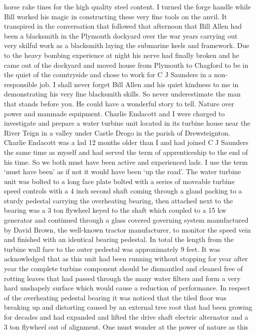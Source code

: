 horse rake tines for the high quality steel content. I turned the forge handle
while Bill worked his magic in constructing these very fine tools on the anvil.
It transpired in the conversation that followed that afternoon that Bill Allen
had been a blacksmith in the Plymouth dockyard over the war years carrying out
very skilful work as a blacksmith laying the submarine keels and framework. Due
to the heavy bombing experience at night his nerve had finally broken and he
came out of the dockyard and moved house from Plymouth to Chagford to be in the
quiet of the countryside and chose to work for C J Saunders in a
non-responsible job. I shall never forget Bill Allen and his quiet kindness to
me in demonstrating his very fine blacksmith skills. So never underestimate
the man that stands before you. He could have a wonderful story to tell.
Nature over power and manmade equipment. Charlie Endacott and I were charged
to investigate and prepare a water turbine unit located in its turbine house
near the River Teign in a valley under Castle Drogo in the parish of
Drewsteignton. Charlie Endacott was a lad 12 months older than I and had
joined C J Saunders the same time as myself and had served the term of
apprenticeship to the end of his time. So we both must have been active and
experienced lads. I use the term ‘must have been' as if not it would have
been ‘up the road'. The water turbine unit was bolted to a long face plate
bolted with a series of moveable turbine speed controls with a 4 inch second
shaft coming through a gland packing to a sturdy pedestal carrying the
overheating bearing, then attached next to the bearing was a 3 ton flywheel
keyed to the shaft which coupled to a 15 kw generator and continued through a
glass covered governing system manufactured by David Brown, the well-known
tractor manufacturer, to monitor the speed vein      and finished with an
identical bearing pedestal. In total the length from the turbine wall face to
the outer pedestal was approximately 9 feet. It was acknowledged that as this
unit had been running without stopping for year after year the complete turbine
component should be dismantled and cleaned free of rotting leaves that had
passed through the many water filters and form a very hard unshapely surface
which would cause a reduction of performance. In respect of the overheating
pedestal bearing it was noticed that the tiled floor was breaking up and
distorting caused by an external tree root that had been growing for decades
and had expanded and lifted the drive shaft electric alternator and a 3 ton
flywheel out of alignment. One must wonder at the power of nature as this
